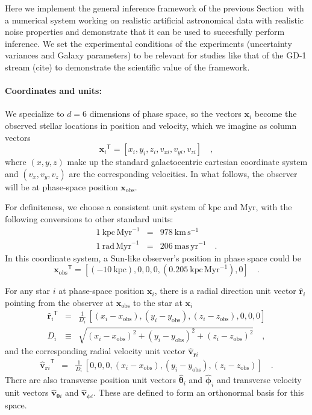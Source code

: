 \documentclass[12pt,preprint]{aastex}
\newcommand{\mtensor}[1]{\boldsymbol{#1}}
\newcommand{\mvector}[1]{\mtensor{#1}}
\renewcommand{\vr}{\mvector{r}}
\newcommand{\vv}{\mvector{v}}
\newcommand{\vx}{\mvector{x}}
\newcommand{\vtheta}{\mvector{\theta}}
\newcommand{\vphi}{\mvector{\phi}}
\newcommand{\transpose}[1]{{#1}^{\textsf{T}}}
\newcommand{\rhat}{\hat{\vr}}
\newcommand{\thetahat}{\hat{\vtheta}}
\newcommand{\phihat}{\hat{\vphi}}
\newcommand{\vhat}{\hat{\vv}}
\newcommand{\unit}[1]{\mathrm{#1}}
\newcommand{\kpc}{\unit{kpc}}
\newcommand{\Myr}{\unit{Myr}}
\newcommand{\kpcpMyr}{\kpc\,\Myr^{-1}}
\newcommand{\km}{\unit{km}}
\newcommand{\s}{\unit{s}}
\newcommand{\kmps}{\km\,\s^{-1}}
\newcommand{\rad}{\unit{rad}}
\newcommand{\radpMyr}{\rad\,\Myr^{-1}}
\newcommand{\mas}{\unit{mas}}
\newcommand{\yr}{\unit{yr}}
\newcommand{\maspyr}{\mas\,\yr^{-1}}
\newcommand{\obs}{\mathrm{obs}}
\newcommand{\vxobs}{\vx_{\mathrm{obs}}}
\newcommand{\sectionname}{Section}
\begin{document}
Here we implement the general inference framework of the previous
\sectionname\ with a numerical system working on realistic artificial
astronomical data with realistic noise properties and demonstrate that
it can be used to succesfully perform inference.  We set the experimental conditions of the
experiments (uncertainty variances and Galaxy parameters) to be
relevant for studies like that of the GD-1 stream (cite) to
demonstrate the scientific value of the framework.

\paragraph{Coordinates and units:}
We specialize to $d=6$ dimensions of phase space, so the vectors
$\vx_i$ become the observed stellar locations in position and velocity,
which we imagine as column vectors
\begin{equation}
\transpose{\vx_i} = [x_i, y_i, z_i, v_{xi}, v_{yi}, v_{zi}]
\quad,
\end{equation}
where $(x,y,z)$ make up the standard galactocentric cartesian coordinate system and
$(v_x,v_y,v_z)$ are the corresponding velocities.  In what follows,
the observer will be at phase-space position $\vxobs$.

For definiteness, we choose a consistent unit system of $\kpc$ and
$\Myr$, with the following conversions to other standard units:
\begin{eqnarray}\displaystyle
1~\kpcpMyr &=& 978~\kmps
\nonumber \\
1~\radpMyr &=& 206~\maspyr
\quad .
\end{eqnarray}
In this coordinate system, a Sun-like observer's position in phase
space could be
\begin{equation}
\transpose{\vxobs} = [(-10~\kpc), 0, 0, 0, (0.205~\kpcpMyr), 0]
\quad.
\end{equation}

For any star $i$ at phase-space position $\vx_i$, there is a radial
direction unit vector $\rhat_i$ pointing from the observer at $\vxobs$
to the star at $\vx_i$
\begin{eqnarray}\displaystyle
\transpose{\rhat_i} &=& \frac{1}{D_i}\,[(x_i-x_\obs), (y_i-y_\obs), (z_i-z_\obs), 0, 0, 0]
\nonumber\\
D_i &\equiv& \sqrt{(x_i-x_\obs)^2+(y_i-y_\obs)^2+(z_i-z_\obs)^2}
\quad,
\end{eqnarray}
and the corresponding radial velocity unit vector $\vhat_{\vr i}$
\begin{eqnarray}\displaystyle
\transpose{\vhat_{\vr i}} &=& \frac{1}{D_i}\,[0, 0, 0, (x_i-x_\obs), (y_i-y_\obs), (z_i-z_\obs)]
\quad .
\end{eqnarray}
There are also transverse position unit vectors $\thetahat_i$ and
$\phihat_i$ and transverse velocity unit vectors $\vhat_{\vtheta i}$
and $\vhat_{\vphi i}$.  These are defined to form an orthonormal basis for this space.
\end{document}
